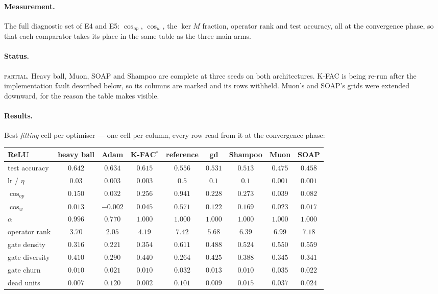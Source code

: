 \documentclass{article} %
\theoremstyle{plain}
\theoremstyle{definition}
\theoremstyle{remark}
\begin{document}
\paragraph{Measurement.}
The full diagnostic set of E4 and E5: $\cos_{op}$, $\cos_w$, the $\ker M$ fraction, operator rank
and test accuracy, all at the convergence phase, so that each comparator takes its place in the same table as the three
main arms.

\paragraph{Status.} \textsc{partial}. Heavy ball, Muon, SOAP and Shampoo are complete at three
seeds on both architectures. K-FAC is being re-run after the implementation fault described below,
so its columns are marked and its rows withheld. Muon's and SOAP's grids were extended downward,
for the reason the table makes visible.

\paragraph{Results.} Best \emph{fitting} cell per optimiser --- one cell per column, every row read
from it at the convergence phase:

\begin{center}\small
\begin{tabular}{lcccccccc}
\toprule
ReLU & heavy ball & Adam & K-FAC$^{\ast}$ & reference & gd & Shampoo & Muon & SOAP \\
\midrule
test accuracy & $\mathbf{0.642}$ & $0.634$ & $0.615$ & $0.556$ & $0.531$ & $0.513$ & $0.475$ & $0.458$ \\
lr / $\eta$ & $0.03$ & $0.003$ & $0.003$ & $0.5$ & $0.1$ & $0.1$ & $0.001$ & $0.001$ \\
\midrule
$\cos_{op}$ & $0.150$ & $0.032$ & $0.256$ & $\mathbf{0.941}$ & $0.228$ & $0.273$ & $0.039$ & $0.082$ \\
$\cos_w$ & $0.013$ & $-0.002$ & $0.045$ & $0.571$ & $0.122$ & $0.169$ & $0.023$ & $0.017$ \\
$\alpha$ & $0.996$ & $0.770$ & $1.000$ & $1.000$ & $1.000$ & $1.000$ & $1.000$ & $1.000$ \\
operator rank & $3.70$ & $\mathbf{2.05}$ & $4.19$ & $7.42$ & $5.68$ & $6.39$ & $6.99$ & $7.18$ \\
gate density & $0.316$ & $\mathbf{0.221}$ & $0.354$ & $0.611$ & $0.488$ & $0.524$ & $0.550$ & $0.559$ \\
gate diversity & $0.410$ & $0.290$ & $0.440$ & $0.264$ & $0.425$ & $0.388$ & $0.345$ & $0.341$ \\
gate churn & $0.010$ & $0.021$ & $0.010$ & $0.032$ & $0.013$ & $0.010$ & $0.035$ & $0.022$ \\
dead units & $0.007$ & $0.120$ & $0.002$ & $0.101$ & $0.009$ & $0.015$ & $0.037$ & $0.024$ \\
\bottomrule
\end{tabular}
\end{center}
\end{document}
